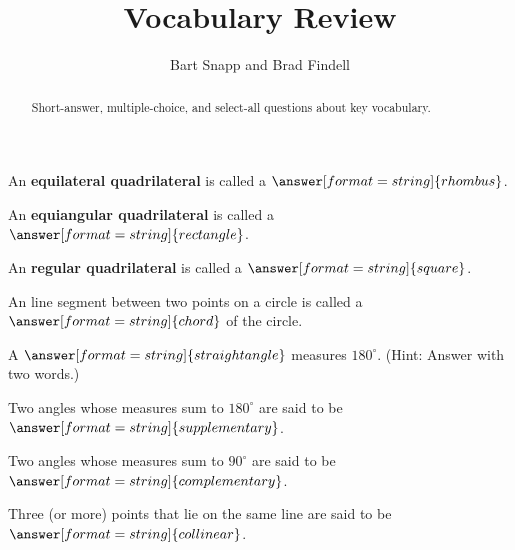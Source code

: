 \documentclass[nooutcomes]{ximera}
\title{Vocabulary Review}
\author{Bart Snapp and Brad Findell}
\begin{document}
\begin{abstract}
Short-answer, multiple-choice, and select-all questions about key vocabulary. 
\end{abstract}
\maketitle

%


\begin{question}  
An \textbf{equilateral quadrilateral} is called a $\answer[format=string]{rhombus}$.
\end{question}

\begin{question}  
An \textbf{equiangular quadrilateral} is called a $\answer[format=string]{rectangle}$. 
\end{question}

\begin{question}  
An \textbf{regular quadrilateral} is called a $\answer[format=string]{square}$. 
\end{question}

\begin{question}  
An line segment between two points on a circle is called a $\answer[format=string]{chord}$ of the circle.  
\end{question}

\begin{question}  
A $\answer[format=string]{straight angle}$ measures $180^\circ$.  (Hint: Answer with two words.)
\end{question}

\begin{question}  
Two angles whose measures sum to $180^\circ$ are said to be $\answer[format=string]{supplementary}$.  
\end{question}

\begin{question}  
Two angles whose measures sum to $90^\circ$ are said to be $\answer[format=string]{complementary}$.  
\end{question}

\begin{question}  
Three (or more) points that lie on the same line are said to be $\answer[format=string]{collinear}$.  
\end{question}
\end{document}
